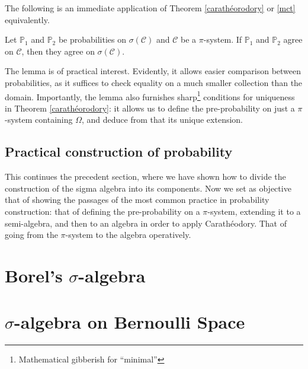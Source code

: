 The following is an immediate application of Theorem \ref{carathéorodory} or \ref{mct} equivalently.
\begin{my_lemma}
	Let $\mathbb{P}_1$ and $\mathbb{P}_2$ be probabilities on $\sigma(\mathcal{C})$ and $\mathcal{C}$ be a $\pi$-system. If $\mathbb{P}_1$ and $\mathbb{P}_2$ agree on $\mathcal{C}$, then they agree on $\sigma(\mathcal{C})$.
\end{my_lemma}
\begin{my_remark}
	The lemma is of practical interest. Evidently, it allows easier comparison between probabilities, as it suffices to check equality on a much smaller collection than the domain. Importantly, the lemma also furnishes sharp\footnote{Mathematical gibberish for ``minimal''} conditions for uniqueness in Theorem \ref{carathéorodory}: it allows us to define the pre-probability on just a $\pi$-system containing $\Omega$, and deduce from that its unique extension.
\end{my_remark}

\subsection{Practical construction of probability}

This continues the precedent section, where we have shown how to divide the construction of the sigma algebra into its components. Now we  set as objective that of showing the passages of the most common practice in probability construction: that of defining the pre-probability on a $\pi$-system, extending it to a semi-algebra, and then to an algebra in order to apply Carathéodory. That of going from the $\pi$-system to the algebra operatively. 








\section*{Borel's $\sigma$-algebra}

\section*{$\sigma$-algebra on Bernoulli Space}

% 


